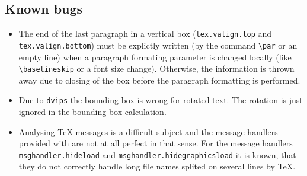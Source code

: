 \subsection{Known bugs}
\begin{itemize}
\item The end of the last paragraph in a vertical box
(\verb|tex.valign.top| and \verb|tex.valign.bottom|) must be explictly
written (by the command \verb|\par| or an empty line) when a paragraph
formating parameter is changed locally (like \verb|\baselineskip| or a
font size change).  Otherwise, the information is thrown away due to
closing of the box before the paragraph formatting is performed.
\item Due to \verb|dvips| the bounding box is wrong for rotated text.
The rotation is just ignored in the bounding box calculation.
\item Analysing \TeX{} messages is a difficult subject and the message
handlers provided with \PyX{} are not at all perfect in that sense.
For the message handlers \verb|msghandler.hideload| and
\verb|msghandler.hidegraphicsload| it is known, that they do not
correctly handle long file names splited on several lines by \TeX.
\end{itemize}
